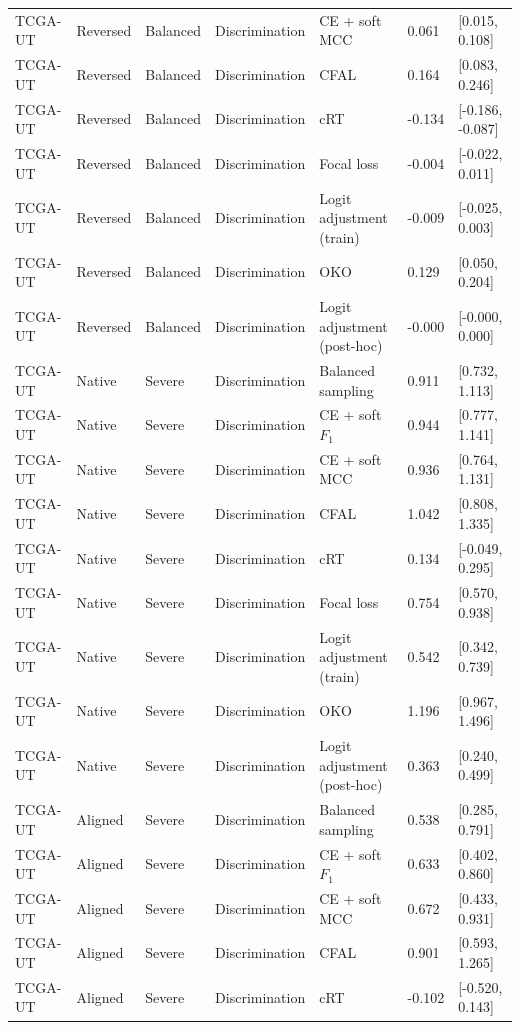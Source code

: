 \begin{longtable}{lllllll}
TCGA-UT & Reversed & Balanced & Discrimination & CE + soft MCC & 0.061 & [0.015, 0.108] \\
TCGA-UT & Reversed & Balanced & Discrimination & CFAL & 0.164 & [0.083, 0.246] \\
TCGA-UT & Reversed & Balanced & Discrimination & cRT & -0.134 & [-0.186, -0.087] \\
TCGA-UT & Reversed & Balanced & Discrimination & Focal loss & -0.004 & [-0.022, 0.011] \\
TCGA-UT & Reversed & Balanced & Discrimination & Logit adjustment (train) & -0.009 & [-0.025, 0.003] \\
TCGA-UT & Reversed & Balanced & Discrimination & OKO & 0.129 & [0.050, 0.204] \\
TCGA-UT & Reversed & Balanced & Discrimination & Logit adjustment (post-hoc) & -0.000 & [-0.000, 0.000] \\
TCGA-UT & Native & Severe & Discrimination & Balanced sampling & 0.911 & [0.732, 1.113] \\
TCGA-UT & Native & Severe & Discrimination & CE + soft $F_1$ & 0.944 & [0.777, 1.141] \\
TCGA-UT & Native & Severe & Discrimination & CE + soft MCC & 0.936 & [0.764, 1.131] \\
TCGA-UT & Native & Severe & Discrimination & CFAL & 1.042 & [0.808, 1.335] \\
TCGA-UT & Native & Severe & Discrimination & cRT & 0.134 & [-0.049, 0.295] \\
TCGA-UT & Native & Severe & Discrimination & Focal loss & 0.754 & [0.570, 0.938] \\
TCGA-UT & Native & Severe & Discrimination & Logit adjustment (train) & 0.542 & [0.342, 0.739] \\
TCGA-UT & Native & Severe & Discrimination & OKO & 1.196 & [0.967, 1.496] \\
TCGA-UT & Native & Severe & Discrimination & Logit adjustment (post-hoc) & 0.363 & [0.240, 0.499] \\
TCGA-UT & Aligned & Severe & Discrimination & Balanced sampling & 0.538 & [0.285, 0.791] \\
TCGA-UT & Aligned & Severe & Discrimination & CE + soft $F_1$ & 0.633 & [0.402, 0.860] \\
TCGA-UT & Aligned & Severe & Discrimination & CE + soft MCC & 0.672 & [0.433, 0.931] \\
TCGA-UT & Aligned & Severe & Discrimination & CFAL & 0.901 & [0.593, 1.265] \\
TCGA-UT & Aligned & Severe & Discrimination & cRT & -0.102 & [-0.520, 0.143] \\

\end{longtable}
